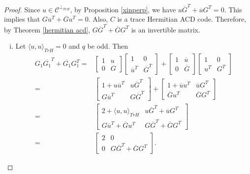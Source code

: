 \documentclass[sn-mathphys-num]{sn-jnl}%
\theoremstyle{thmstyleone}%
\theoremstyle{thmstyletwo}%
\theoremstyle{thmstylethree}%
\begin{document}
\begin{proof}
	Since $u\in \mathcal{C}^{\perp_{TrH}}$, by Proposition \ref{xinperp}, we have $u\overline{G}^T+\overline{u}G^T=0.$ This implies that $G\overline{u}^T+\overline{G}u^T=0.$ Also, $C$ is a trace Hermitian ACD code. Therefore, by Theorem \ref{hermitian acd}, $G\overline{G}^T+ \overline{G}G^T$ is an invertible matrix. 
	\begin{enumerate}[(i)]
		\item Let $\langle u,u\rangle_{TrH}=0$ and $q$ be odd. Then
		\begin{align*}
			G_1 \overline{G_1}^T+\overline{G_1}G_1^T=&\begin{bmatrix}
				1 & u\\
				0 & G
			\end{bmatrix}
			\begin{bmatrix}
				1 & 0 \\
				\overline{u}^T & \overline{G}^T
			\end{bmatrix}+\begin{bmatrix}
				1 & \overline{u}\\
				0 & \overline{G}
			\end{bmatrix}
			\begin{bmatrix}
				1 & 0\\
				u^T & G^T
			\end{bmatrix}\\
			=&\begin{bmatrix}
				1+u\overline{u}^T & u\overline{G}^T\\
				G\overline{u}^T & G\overline{G}^T
			\end{bmatrix}+
			\begin{bmatrix}
				1+\overline{u}u^T &\overline{u}G^T \\
				\overline{G}u^T & \overline{G}G^T
			\end{bmatrix}\\
			=&\begin{bmatrix}
				2+\langle u,u\rangle_{TrH} & u\overline{G}^T+\overline{u}G^T \\
				G\overline{u}^T+\overline{G}u^T &G\overline{G}^T+ \overline{G}G^T
			\end{bmatrix}\\
			=&\begin{bmatrix}
				2 & 0\\
				0 &G\overline{G}^T+ \overline{G}G^T
			\end{bmatrix}.
		\end{align*} 
		

\end{enumerate}
\end{proof}
\end{document}
